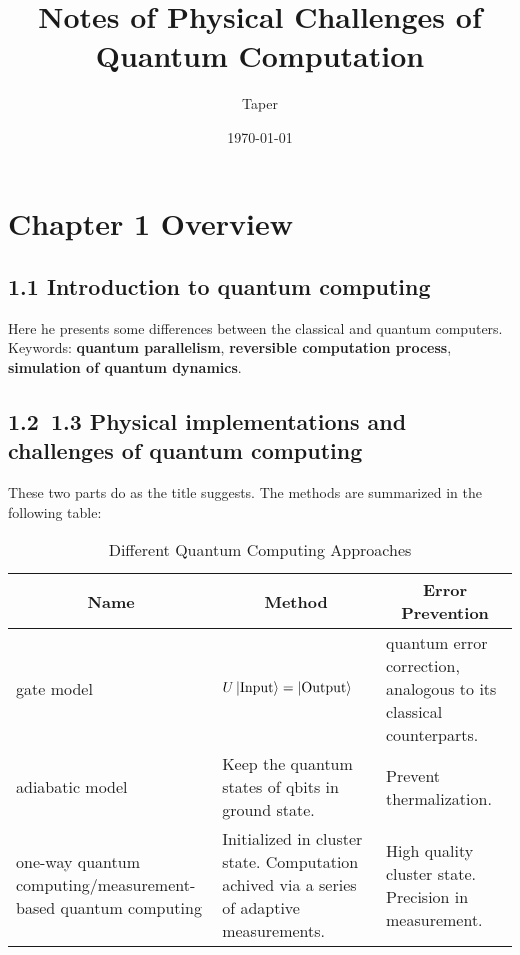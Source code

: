 \documentclass{article}
\title{Notes of Physical Challenges of Quantum Computation}
\date{\today}
\author{Taper}
\numberwithin{equation}{subsection} %
\theoremstyle{definition}
\begin{document}
\maketitle
{}
\tableofcontents
\section{Chapter 1 Overview}
\label{sec:Chapter_1_Overview}

    \subsection{1.1 Introduction to quantum computing}
    \label{sec:1.1_Introduction_to_quantum_computing}
    Here he presents some differences between the classical and quantum
    computers. Keywords: \textbf{quantum parallelism}, \textbf{reversible
    computation process}, \textbf{simulation of quantum dynamics}.

    \subsection{1.2~1.3 Physical implementations and challenges 
    of quantum computing}
    
    These two parts do as the title suggests. The methods are summarized
    in the following table:

    \begin{table}[H]
    \centering
    \caption{Different Quantum Computing Approaches}
    
    \begin{tabular}
        {|p{}|
         p{}|
         p{}|
        }
    \multicolumn{1}{c}{Name} & \multicolumn{1}{c}{Method} & \multicolumn{1}{c}{Error Prevention} \\ \hline
        gate model 
            & $U\ket{\text{Input}}=\ket{\text{Output}}$ 
            & quantum error correction, 
              analogous to its classical counterparts. \\ \hline
        adiabatic model 
            & Keep the quantum states of qbits in ground state. 
            & Prevent thermalization. \\ \hline
        one-way quantum computing/measurement-based quantum computing 
            & Initialized in cluster state. Computation achived via 
              a series of adaptive measurements. 
            & High quality cluster state. Precision in measurement.
        \\ \hline
    \end{tabular}
    
    \end{table}
\end{document}
